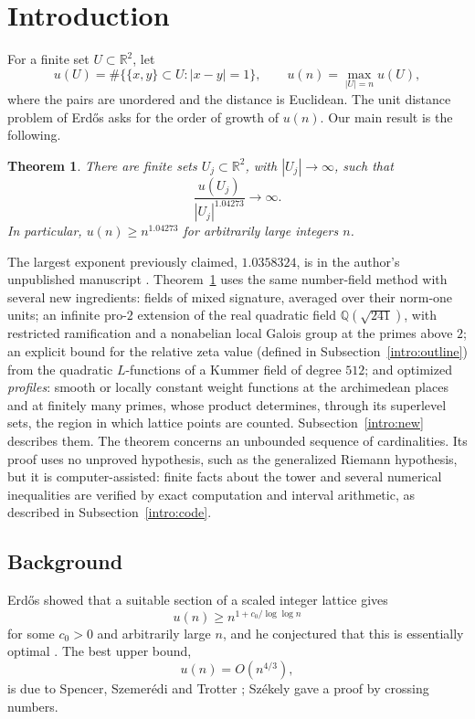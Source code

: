 \documentclass[11pt]{amsart}
\numberwithin{equation}{section}
\newtheorem{theorem}[equation]{Theorem}
\theoremstyle{definition}
\theoremstyle{remark}
\newcommand{\Q}{\mathbb Q}
\newcommand{\R}{\mathbb R}
\begin{document}
\section{Introduction}\label{intro:section}
For a finite set $U\subset\R^2$, let
\[
 u(U)=\#\{\{x,y\}\subset U:|x-y|=1\},\qquad
 u(n)=\max_{|U|=n}u(U),
\]
where the pairs are unordered and the distance is Euclidean. The unit
distance problem of Erd\H{o}s \cite{Erdos1946} asks for the order of
growth of $u(n)$. Our main result is the following.

\begin{theorem}\label{thm:main}
There are finite sets $U_j\subset\R^2$, with $|U_j|\to\infty$, such that
\[
 \frac{u(U_j)}{|U_j|^{1.04273}}\longrightarrow\infty.
\]
In particular, $u(n)\ge n^{1.04273}$ for arbitrarily large integers $n$.
\end{theorem}

The largest exponent previously claimed, $1.0358324$, is in the author's
unpublished manuscript \cite{Naslund0358}. Theorem~\ref{thm:main} uses
the same number-field method with several new ingredients: fields of
mixed signature, averaged over their norm-one units; an infinite
pro-$2$ extension of the real quadratic field $\Q(\sqrt{241})$, with
restricted ramification and a nonabelian local Galois group at the
primes above $2$; an explicit
bound for the relative zeta value (defined in
Subsection~\ref{intro:outline}) from the quadratic $L$-functions of a
Kummer field of degree $512$; and optimized \emph{profiles}: smooth or
locally constant weight functions at the archimedean places and at
finitely many primes, whose product determines, through its superlevel
sets, the region in which lattice points are counted. Subsection~\ref{intro:new} describes
them. The theorem concerns an unbounded sequence of cardinalities. Its
proof uses no unproved hypothesis, such as the generalized Riemann
hypothesis, but it is computer-assisted: finite facts about the tower
and several numerical inequalities are verified by exact computation and
interval arithmetic, as described in Subsection~\ref{intro:code}.

\subsection{Background}\label{intro:background}
Erd\H{o}s \cite{Erdos1946} showed that a suitable section of a scaled
integer lattice gives
\[
 u(n)\ge n^{1+c_0/\log\log n}
\]
for some $c_0>0$ and arbitrarily large $n$, and he conjectured that this is
essentially optimal \cite{Erdos1946,Erdos1994}. The best upper bound,
\[
 u(n)=O(n^{4/3}),
\]
is due to Spencer, Szemer\'edi and Trotter
\cite{SpencerSzemerediTrotter1984}; Sz\'ekely \cite{Szekely1997} gave a
proof by crossing numbers.
\end{document}
